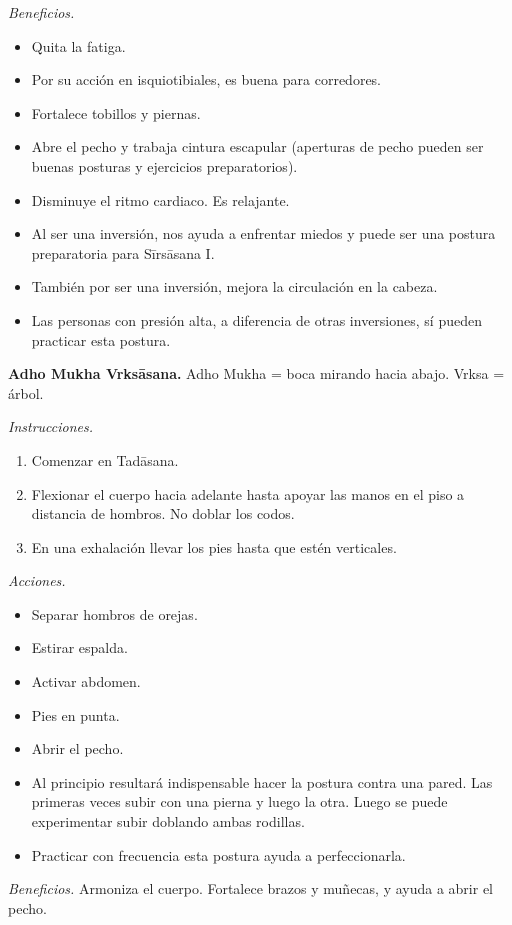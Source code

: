 \emph{Beneficios.}
\begin{itemize}
\item Quita la fatiga.
\item Por su acción en isquiotibiales, es
buena para corredores.
\item Fortalece tobillos y piernas.
\item Abre el pecho y trabaja cintura
escapular (aperturas de pecho pueden ser
buenas posturas y ejercicios preparatorios).
\item Disminuye el ritmo cardiaco. Es
relajante.
\item Al ser una inversión, nos ayuda a
enfrentar miedos y puede ser una postura
preparatoria para Sīrsāsana I.
\item También por ser una inversión, mejora
la circulación en la cabeza.
\item Las personas con presión alta, a
diferencia de otras inversiones, sí pueden
practicar esta postura.
\end{itemize}

\medskip\noindent\textbf{Adho Mukha
Vrksāsana.}
Adho Mukha = boca mirando hacia abajo. Vrksa
= árbol.

\emph{Instrucciones.}
\begin{enumerate}
\item Comenzar en Tadāsana.
\item Flexionar el cuerpo hacia adelante
hasta apoyar las manos en el piso a distancia
de hombros. No doblar los codos.
\item En una exhalación llevar los pies hasta
que estén verticales.
\end{enumerate}

\emph{Acciones.}
\begin{itemize}
\item Separar hombros de orejas.
\item Estirar espalda.
\item Activar abdomen.
\item Pies en punta.
\item Abrir el pecho.
\item Al principio resultará indispensable
hacer la postura contra una pared. Las
primeras veces subir con una pierna y luego
la otra. Luego se puede experimentar subir
doblando ambas rodillas.
\item Practicar con frecuencia esta postura
ayuda a perfeccionarla.
\end{itemize}

\emph{Beneficios.} Armoniza el cuerpo.
Fortalece brazos y muñecas, y ayuda a abrir
el pecho.

